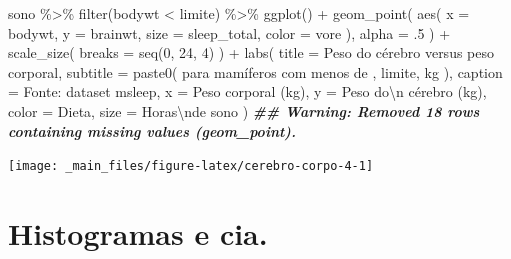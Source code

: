 \documentclass[
  12pt]{report}
\newenvironment{Shaded}{\begin{snugshade}}{\end{snugshade}}
\newcommand{\AttributeTok}[1]{\textcolor[rgb]{0.77,0.63,0.00}{#1}}
\newcommand{\DecValTok}[1]{\textcolor[rgb]{0.00,0.00,0.81}{#1}}
\newcommand{\DocumentationTok}[1]{\textcolor[rgb]{0.56,0.35,0.01}{\textbf{\textit{#1}}}}
\newcommand{\FunctionTok}[1]{\textcolor[rgb]{0.00,0.00,0.00}{#1}}
\newcommand{\NormalTok}[1]{#1}
\newcommand{\SpecialCharTok}[1]{\textcolor[rgb]{0.00,0.00,0.00}{#1}}
\newcommand{\StringTok}[1]{\textcolor[rgb]{0.31,0.60,0.02}{#1}}
\begin{document}
\begin{Shaded}
\begin{Highlighting}[]
\NormalTok{sono }\SpecialCharTok{\%\textgreater{}\%} 
  \FunctionTok{filter}\NormalTok{(bodywt }\SpecialCharTok{\textless{}}\NormalTok{ limite) }\SpecialCharTok{\%\textgreater{}\%} 
  \FunctionTok{ggplot}\NormalTok{() }\SpecialCharTok{+}
    \FunctionTok{geom\_point}\NormalTok{(}
      \FunctionTok{aes}\NormalTok{(}
        \AttributeTok{x =}\NormalTok{ bodywt, }
        \AttributeTok{y =}\NormalTok{ brainwt,}
        \AttributeTok{size =}\NormalTok{ sleep\_total,}
        \AttributeTok{color =}\NormalTok{ vore}
\NormalTok{      ), }
      \AttributeTok{alpha =}\NormalTok{ .}\DecValTok{5}
\NormalTok{    ) }\SpecialCharTok{+}
    \FunctionTok{scale\_size}\NormalTok{(}
      \AttributeTok{breaks =} \FunctionTok{seq}\NormalTok{(}\DecValTok{0}\NormalTok{, }\DecValTok{24}\NormalTok{, }\DecValTok{4}\NormalTok{)}
\NormalTok{    ) }\SpecialCharTok{+}
    \FunctionTok{labs}\NormalTok{(}
      \AttributeTok{title =} \StringTok{\textquotesingle{}Peso do cérebro versus peso corporal\textquotesingle{}}\NormalTok{,}
      \AttributeTok{subtitle =} \FunctionTok{paste0}\NormalTok{(}
        \StringTok{\textquotesingle{}para mamíferos com menos de \textquotesingle{}}\NormalTok{, }
\NormalTok{        limite, }
        \StringTok{\textquotesingle{} kg\textquotesingle{}}
\NormalTok{      ),}
      \AttributeTok{caption =} \StringTok{\textquotesingle{}Fonte: dataset \textasciigrave{}msleep\textasciigrave{}\textquotesingle{}}\NormalTok{,}
      \AttributeTok{x =} \StringTok{\textquotesingle{}Peso corporal (kg)\textquotesingle{}}\NormalTok{,}
      \AttributeTok{y =} \StringTok{\textquotesingle{}Peso do}\SpecialCharTok{\textbackslash{}n}\StringTok{ cérebro (kg)\textquotesingle{}}\NormalTok{,}
      \AttributeTok{color =} \StringTok{\textquotesingle{}Dieta\textquotesingle{}}\NormalTok{,}
      \AttributeTok{size =} \StringTok{\textquotesingle{}Horas}\SpecialCharTok{\textbackslash{}n}\StringTok{de sono\textquotesingle{}}
\NormalTok{    )}
\DocumentationTok{\#\# Warning: Removed 18 rows containing missing values (geom\_point).}
\end{Highlighting}
\end{Shaded}

\begin{center}\texttt{[image: \_main\_files/figure-latex/cerebro-corpo-4-1]} \end{center}

\hypertarget{histogramas-e-cia.}{%
\section{Histogramas e cia.}\label{histogramas-e-cia.}}
\end{document}
